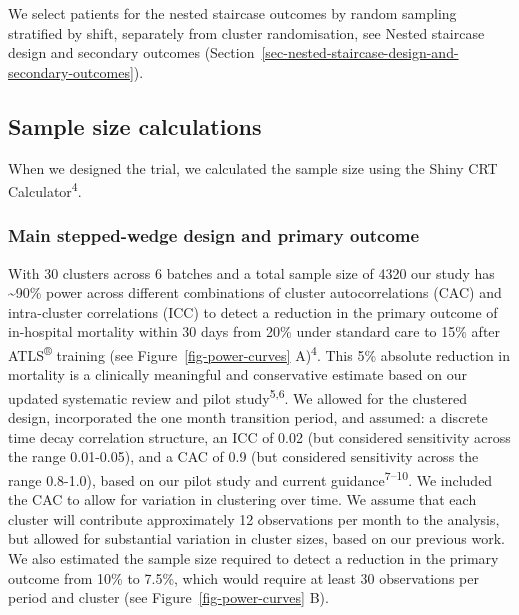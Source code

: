 \documentclass[
]{scrartcl}
\begin{document}
We select patients for the nested staircase outcomes by random sampling
stratified by shift, separately from cluster randomisation, see
Nested staircase design and secondary outcomes
(Section~\ref{sec-nested-staircase-design-and-secondary-outcomes}).

\subsection{Sample size
calculations}\label{sec-sample-size-calculations}

When we designed the trial, we calculated the sample size using the
Shiny CRT Calculator\textsuperscript{4}.

\subsubsection{Main stepped-wedge design and primary
outcome}\label{sec-main-stepped-wedge-design-and-primary-outcome}

With 30 clusters across 6 batches and a total sample size of 4320 our
study has \textasciitilde90\% power across different combinations of
cluster autocorrelations (CAC) and intra-cluster correlations (ICC) to
detect a reduction in the primary outcome of in-hospital mortality
within 30 days from 20\% under standard care to 15\% after
ATLS\textsuperscript{®} training (see Figure~\ref{fig-power-curves}
A)\textsuperscript{4}. This 5\% absolute reduction in mortality is a
clinically meaningful and conservative estimate based on our updated
systematic review and pilot study\textsuperscript{5,6}. We allowed for
the clustered design, incorporated the one month transition period, and
assumed: a discrete time decay correlation structure, an ICC of 0.02
(but considered sensitivity across the range 0.01-0.05), and a CAC of
0.9 (but considered sensitivity across the range 0.8-1.0), based on our
pilot study and current guidance\textsuperscript{7--10}. We included the
CAC to allow for variation in clustering over time. We assume that each
cluster will contribute approximately 12 observations per month to the
analysis, but allowed for substantial variation in cluster sizes, based
on our previous work. We also estimated the sample size required to
detect a reduction in the primary outcome from 10\% to 7.5\%, which
would require at least 30 observations per period and cluster (see
Figure~\ref{fig-power-curves} B).
\end{document}
